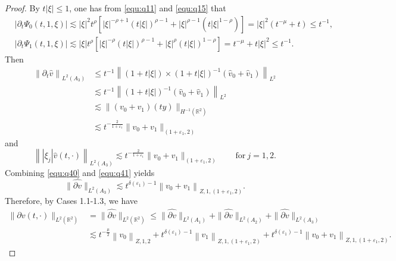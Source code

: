 \documentclass[11pt,twoside]{article}
\newcommand{\R}{\mathbb R}
\newcommand{\p}{\partial}
\newcommand{\f}{\frac}
\theoremstyle{plain}
\theoremstyle{definition}
\theoremstyle{remark}
\numberwithin{equation}{section}
\begin{document}
\begin{proof}
By $t|\xi| \leq 1$, one has from \eqref{equ:q11} and \eqref{equ:q15} that
\begin{equation}\label{equ:q39}
\begin{aligned}
& \left|\p_t\Psi_0(t, 1,\xi)\right| \lesssim|\xi|^2 t^\rho[|\xi|^{-\rho+1}(t|\xi|)^{\rho-1}+|\xi|^{\rho-1}(t|\xi|^{1-\rho})]=|\xi|^2(t^{-\mu}+t)\leq t^{-1}, \\
& \left|\p_t\Psi_1(t, 1, \xi)\right|  \lesssim |\xi|t^\rho[|\xi|^{-\rho}(t|\xi|)^{\rho-1}+|\xi|^{\rho}(t|\xi|)^{1-\rho}]=
t^{-\mu}+t|\xi|^2\leq t^{-1}.
\end{aligned}
\end{equation}
Then
\begin{equation}\label{equ:q40}
\begin{aligned}
\left\|\p_t\hat{v}\right\|_{L^2(A_3)} & \leq t^{-1}\left\|(1+t|\xi|)\times(1+t|\xi|)^{-1}(\hat{v}_{0}+\hat{v}_{1})\right\|_{L^{2}} \\
&\lesssim t^{-1}\left\|(1+t|\xi|)^{-1}(\hat{v}_{0}+\hat{v}_{1})\right\|_{L^{2}}\\
& \lesssim \|(v_0+v_1)(ty)\|_{H^{-1}(\R^2)}\\
&\lesssim t^{-\f{2}{1+\varepsilon_1}}\|v_0+v_1\|_{(1+\varepsilon_1, 2)}
\end{aligned}
\end{equation}
and
\begin{equation}\label{equ:q41}
\left\||\xi_j|\hat{v}(t, \cdot)\right\|_{L^2(A_3)} \lesssim t^{-\f{2}{1+\varepsilon_1}}\|v_0+v_1\|_{(1+\varepsilon_1, 2)}\quad\quad\text{for}~ j=1,2.
\end{equation}
Combining \eqref{equ:q40} and \eqref{equ:q41} yields
\begin{equation}\label{equ:q42}
\|\widehat{\p v}\|_{L^2(A_3)} \lesssim t^{\delta(\varepsilon_1)-1}\left\|v_0+v_1\right\|_{Z, 1,(1+\varepsilon_1, 2)}.
\end{equation}
Therefore, by Cases 1.1-1.3, we have
\begin{equation}\label{equ:q43}
\begin{aligned}
\|\p v(t, \cdot)\|_{L^2(\R^2)}&=\|\widehat{\p v}\|_{L^2(\R^2)} \leq\|\widehat{\p v}\|_{L^2(A_1)}
+\|\widehat{\p v}\|_{L^2(A_2)}+\|\widehat{\p v}\|_{L^2(A_3)}\\
&\lesssim t^{-\f{\mu}{2}}\left\|v_0\right\|_{Z, 1, 2}+t^{\delta(\varepsilon_1)-1}\left\|v_1\right\|_{Z, 1,(1+\varepsilon_1, 2)}+t^{\delta(\varepsilon_1)-1}\left\|v_0+v_1\right\|_{Z, 1,(1+\varepsilon_1, 2)}.
\end{aligned}
\end{equation}


\end{proof}
\end{document}
